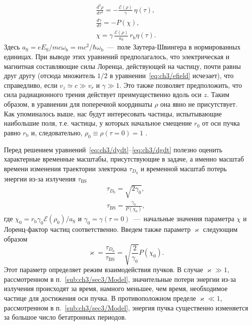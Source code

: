 \begin{gather}
    \label{eq:ch3/dydt}
    \frac{d^2\rho}{d\tau^2}  =  -\frac{\mathcal{E}(\rho) }{\gamma} \,\eta(\tau),   \\
    \label{eq:ch3/dgdt}
    \frac{d\gamma}{d\tau}  =  -P(\chi),  \\
    \label{eq:ch3/c2}
    \chi  =  \gamma\, \frac{\mathcal{E}(\rho)}{a_\mathrm{S}} \,r_\mathrm{b} \eta(\tau).
\end{gather}
Здесь $a_\mathrm{S} = e E_\mathrm{S} / m c \omega_\mathrm{b} = mc^2 /\hbar \omega_\mathrm{b}$~---~поле Заутера-Швингера в нормированных единицах.
При выводе этих уравнений предполагалось, что электрическая и магнитная составляющие силы Лоренца, действующей на частицу, почти равны друг другу (отсюда множитель $1/2$ в уравнении~\eqref{eq:ch3/efield} исчезает), что справедливо, если $v_z \simeq c \gg v_r$ и $\gamma\gg 1$.
Это также позволяет предположить, что сила радиационного трения действует преимущественно вдоль оси $z$.
Таким образом, в уравнении для поперечной координаты $\rho$ она явно не присутствует.
Как упоминалось выше, нас будут интересовать частицы, испытывающие наибольшие поля, т.е. частицы, у которых начальное смещение $r_0$ от оси пучка равно $r_\mathrm{b}$ и, следовательно, $\rho_0 \equiv \rho(\tau=0) = 1$ .

Перед решением уравнений~\eqref{eq:ch3/dydt}--\eqref{eq:ch3/dgdt} полезно оценить характерные временные масштабы, присутствующие в задаче, а именно масштаб времени изменения траектории электрона $\tau_{ D_0}$ и временной масштаб потерь энергии из-за излучения $\tau_\mathrm{BS}$
\begin{gather}
    \tau_{D_0} = \sqrt{2\gamma_0}, \\
    \tau_\mathrm{BS} = \frac{\gamma_0}{P(\chi_0)},
\end{gather}
где $\chi_0 = r_\mathrm{b} \gamma_0 \mathcal{E}\left( \rho_0 \right) / a_\mathrm{S} $ и $\gamma_0 = \gamma(\tau = 0)$~---~начальные значения параметра $\chi$ и Лоренц-фактор частиц соответственно.
Введем также параметр $\varkappa$ следующим образом
\begin{equation}
    \label{eq:ch3/condition}
    \varkappa = \frac{\tau_{D_0}}{\tau_\mathrm{BS}} = \sqrt{\frac{2}{\gamma_0}}P(\chi_0).
\end{equation}
Этот параметр определяет режим взаимодействия пучков.
В случае $\varkappa \gg 1$, рассмотренном в п.~\ref{sub:ch3/sec3/Model}, значительные потери энергии из-за излучения происходят за время, намного меньшее, чем время, необходимое частице для достижения оси пучка.
В противоположном пределе $\varkappa \ll 1$, рассмотренном в п.~\ref{sub:ch3/sec3/Model}, энергия пучка существенно изменяется за большое число бетатронных периодов.

